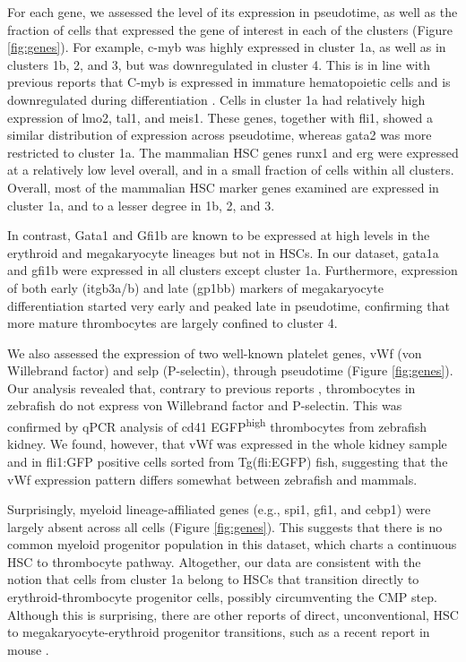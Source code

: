 For each gene, we assessed the level of its expression in pseudotime, as well as the fraction of cells that expressed the gene of interest in each of the clusters (Figure \ref{fig:genes}). For example, c-myb was highly expressed in cluster 1a, as well as in clusters 1b, 2, and 3, but was downregulated in cluster 4. This is in line with previous reports that C-myb is expressed in immature hematopoietic cells and is downregulated during differentiation  \cite{Greig2008-ab}. Cells in cluster 1a had relatively high expression of lmo2, tal1, and meis1. These genes, together with fli1, showed a similar distribution of expression across pseudotime, whereas gata2 was more restricted to cluster 1a. The mammalian HSC genes runx1 and erg were expressed at a relatively low level overall, and in a small fraction of cells within all clusters. Overall, most of the mammalian HSC marker genes examined are expressed in cluster 1a, and to a lesser degree in 1b, 2, and 3.

In contrast, Gata1 and Gfi1b are known to be expressed at high levels in the erythroid and megakaryocyte lineages  \cite{Orkin2008-os, Vassen2007-ul} but not in HSCs. In our dataset, gata1a and gfi1b were expressed in all clusters except cluster 1a. Furthermore, expression of both early (itgb3a/b) and late (gp1bb) markers of megakaryocyte differentiation started very early and peaked late in pseudotime, confirming that more mature thrombocytes are largely confined to cluster 4.

We also assessed the expression of two well-known platelet genes, vWf (von Willebrand factor) and selp (P-selectin), through pseudotime (Figure \ref{fig:genes}). Our analysis revealed that, contrary to previous reports  \cite{Carrillo2010-gy}, thrombocytes in zebrafish do not express von Willebrand factor and P-selectin. This was confirmed by qPCR analysis of cd41 EGFP\textsuperscript{high} thrombocytes from zebrafish kidney. We found, however, that vWf was expressed in the whole kidney sample and in fli1:GFP positive cells sorted from Tg(fli:EGFP) fish, suggesting that the vWf expression pattern differs somewhat between zebrafish and mammals.

Surprisingly, myeloid lineage-affiliated genes (e.g., spi1, gfi1, and cebp1) were largely absent across all cells (Figure \ref{fig:genes}). This suggests that there is no common myeloid progenitor population in this dataset, which charts a continuous HSC to thrombocyte pathway. Altogether, our data are consistent with the notion that cells from cluster 1a belong to HSCs that transition directly to erythroid-thrombocyte progenitor cells, possibly circumventing the CMP step. Although this is surprising, there are other reports of direct, unconventional, HSC to megakaryocyte-erythroid progenitor transitions, such as a recent report in mouse \cite{Guo2013-si}.

